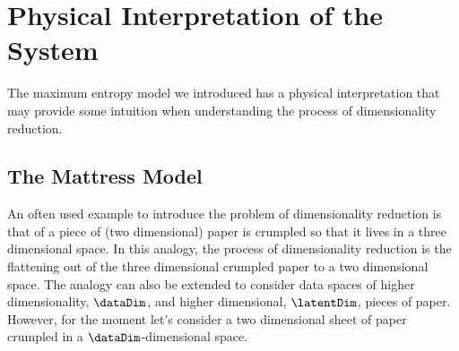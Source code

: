 
\section{Physical Interpretation of the System}

The maximum entropy model we introduced has a physical interpretation
that may provide some intuition when understanding the process of dimensionality
reduction.

\subsection{The Mattress Model}

An  often used  example  to introduce  the  problem of  dimensionality
reduction is that of a piece of (two dimensional) paper is crumpled so
that  it lives  in a  three dimensional  space. In  this  analogy, the
process of dimensionality reduction is the flattening out of the three
dimensional crumpled paper to a two dimensional space. The analogy can
also  be extended to  consider data  spaces of  higher dimensionality,
$\dataDim$,   and   higher   dimensional,  $\latentDim$,   pieces   of
paper. However, for the moment  let's consider a two dimensional sheet
of paper crumpled in a $\dataDim$-dimensional space.

